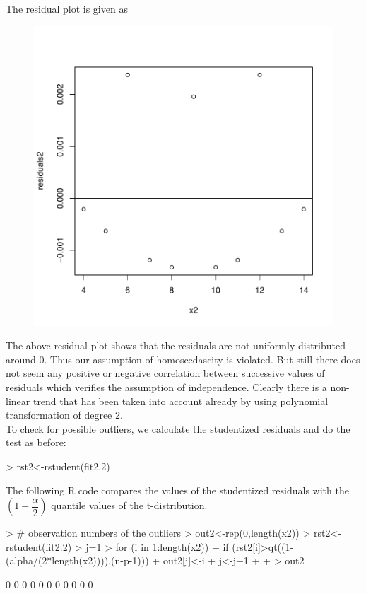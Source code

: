 \documentclass[12pt]{article}
\begin{document}
\begin{itemize}
\clearpage
The residual plot is given as
\begin{figure}[H]
\includegraphics{HW6-012}
\end{figure}
The above residual plot shows that the residuals are not uniformly distributed around 0. Thus our assumption of homoscedascity is violated. But still there does not seem any positive or negative correlation between successive values of residuals which verifies the assumption of independence. Clearly there is a non-linear trend that has been taken into account already by using polynomial transformation of degree 2.\\

To check for possible outliers, we calculate the studentized residuals and do the test as before:
\begin{Schunk}
\begin{Sinput}
> rst2<-rstudent(fit2.2)
\end{Sinput}
\end{Schunk}
The following R code compares the values of the studentized residuals with the $\left(1-\dfrac{\alpha}{2}\right)$ quantile values of the t-distribution.

\begin{Schunk}
\begin{Sinput}
> # observation numbers of the outliers
> out2<-rep(0,length(x2))
> rst2<-rstudent(fit2.2)
> j=1
> for (i in 1:length(x2)){
+   if (rst2[i]>qt((1-(alpha/(2*length(x2)))),(n-p-1))){
+     out2[j]<-i
+     j<-j+1
+   }
+ }
> out2
\end{Sinput}
\begin{Soutput}
 [1] 0 0 0 0 0 0 0 0 0 0 0
\end{Soutput}
\end{Schunk}


\end{itemize}
\end{document}
